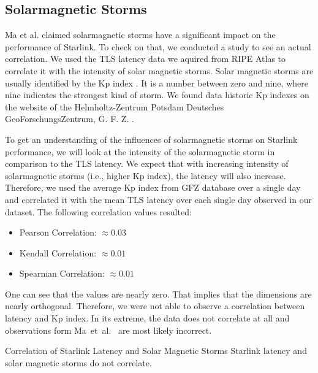 \subsection{Solarmagnetic Storms} \label{sec:solarmagnetic-storms}

Ma et al. \cite{DBLP:conf/infocom/MaCZCML23} claimed solarmagnetic storms have
a significant impact on the performance of Starlink. To check on that, we
conducted a study to see an actual correlation. We used the TLS latency data we
aquired from RIPE Atlas to correlate it with the intensity of solar magnetic
storms. Solar magnetic storms are usually identified by the Kp index
\cite{Bartels1957}. It is a number between zero and nine, where nine indicates
the strongest kind of storm. We found data historic Kp indexes on the website
of the Helmholtz-Zentrum Potsdam Deutsches GeoForschungsZentrum, G. F. Z.
\cite{GFZ2023}.

To get an understanding of the influences of solarmagnetic storms on Starlink
performance, we will look at the intensity of the solarmagnetic storm in
comparison to the TLS latency. We expect that with increasing intensity of
solarmagnetic storms (i.e., higher Kp index), the latency will also increase.
Therefore, we used the average Kp index from GFZ database over a single day and
correlated it with the mean TLS latency over each single day observed in our
dataset. The following correlation values resulted:

\begin{itemize}
	\item Pearson Correlation: $\approx 0.03$
	\item Kendall Correlation: $\approx 0.01$
	\item Spearman Correlation: $\approx 0.01$
\end{itemize}

One can see that the values are nearly zero. That implies that the dimensions
are nearly orthogonal. Therefore, we were not able to observe a correlation
between latency and Kp index. In its extreme, the data does not correlate at
all and observations form Ma~et~al.~\cite{DBLP:conf/infocom/MaCZCML23} are most
likely incorrect.

\begin{takeaway}{Correlation of Starlink Latency and Solar Magnetic Storms}
	Starlink latency and solar magnetic storms do not correlate.
\end{takeaway}

